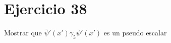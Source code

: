 \section*{Ejercicio 38}
Mostrar que ${\bar{\psi}}'({x}') \gamma_5 {\psi}'({x}')$ es un pseudo escalar
